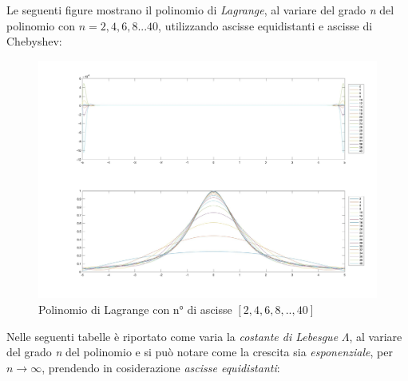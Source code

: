 Le seguenti figure mostrano il polinomio di \textit{Lagrange}, al variare del grado \textit{n} del polinomio con $n=2,4,6,8...40$, utilizzando ascisse equidistanti e ascisse di Chebyshev:
\begin{figure}[H]
	\includegraphics[width=\textwidth]{Chapter-4/Exercise-19/plot.jpg}
	\caption*{Polinomio di Lagrange con n° di ascisse $[2,4,6,8,..,40]$}
\end{figure}
Nelle seguenti tabelle è riportato come varia la \textit{costante di Lebesgue} $\Lambda$, al variare del grado \textit{n} del polinomio e si può notare come la crescita sia \textit{esponenziale}, per $n\rightarrow\infty$, prendendo in cosiderazione \textit{ascisse equidistanti}:\\\
